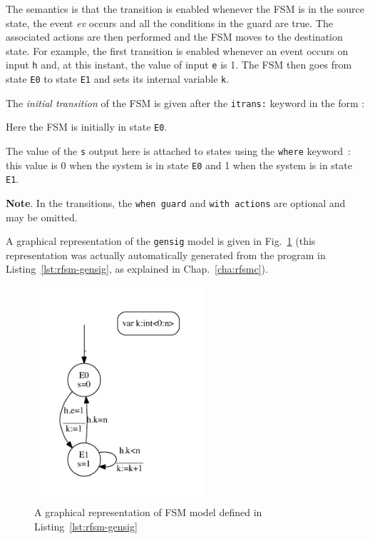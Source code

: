 The semantics is that the transition is enabled
whenever the FSM is in the source state, the event \emph{ev} occurs and all the conditions in the
guard are true. The associated actions
are then performed and the FSM moves to the destination state. For example, the first transition is
enabled whenever an event occurs on input \verb|h| and, at this instant, the value of input \verb|e|
is 1. The FSM then goes from state \verb|E0| to state \verb|E1| and sets its internal variable 
\verb|k|.
   
The \emph{initial transition} of the FSM is given 
after the \verb|itrans:| keyword in the form :
\begin{center}
\end{center}
Here the FSM is initially in state \verb|E0|.

The value of the \texttt{s} output here is attached to states using
the \lstinline[language=Rfsm]{where} keyword~: this value is 0 when the
system is in state \texttt{E0} and 1 when the system is in state \texttt{E1}.

\medskip
\textbf{Note}. In the transitions, the \lstinline[language=Rfsm]{when guard} and
\lstinline[language=Rfsm]{with actions} are optional and may be omitted.

\medskip
A graphical representation of the \verb|gensig| model is given in
Fig.~\ref{fig:rfsm-gensig-model} (this representation was actually automatically generated from the
program in Listing~\ref{lst:rfsm-gensig}, as explained in Chap.~\ref{cha:rfsmc}). 

\begin{figure}[!h]
   \includegraphics[height=8cm]{figs/gensig-model}
   \centering
  \caption{A graphical representation of FSM model defined in Listing~\ref{lst:rfsm-gensig}}
  \label{fig:rfsm-gensig-model}
\end{figure}


